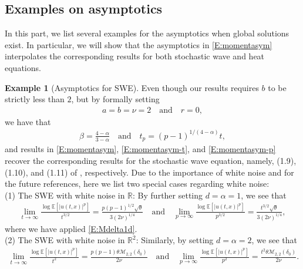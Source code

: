 \documentclass[12pt]{report}
\theoremstyle{plain}
\theoremstyle{definition}
\newtheorem{example}[theorem]{Example}
\numberwithin{equation}{section}
\newcommand{\R}{\mathbb{R}}
\newcommand{\E}{\mathbb{E}}
\begin{document}
\subsection{Examples on asymptotics} \label{SS:EgAsym}

In this part, we list several examples for the asymptotics when global solutions exist. In
particular, we will show that the asymptotics in \eqref{E:momentasym} interpolates the corresponding
results for both stochastic wave and heat equations.

\begin{example}[Asymptotics for SWE] \label{Eg:AsymSWE}
	Even though our results requires $b$ to be strictly less than $2$, but by formally setting
	\begin{align*}
	a = b = \nu = 2 \quad \text{and} \quad r = 0,
	\end{align*}
	we have that
	\begin{align*}
	\beta = \frac{4-\alpha}{3-\alpha} \quad \text{and} \quad
	t_p   = (p-1)^{1/(4-\alpha)} t,
	\end{align*}
	and results in \eqref{E:momentasym}, \eqref{E:momentasym-t}, and \eqref{E:momentasym-p} recover
	the corresponding results for the stochastic wave equation, namely, (1.9), (1.10), and (1.11) of \cite{balan.chen.ea:22:exact}, respectively.  Due to the importance of white noise and for the future references,
	here we list two special cases regarding white noise:\\
	
	\noindent(1) The SWE with white noise in $\R$: By further setting $d=\alpha=1$, we see that
	\begin{align} \label{E:AsymSWE-1d}
	\lim_{t \to \infty} \frac{\log \E\left[|u(t,x)|^p\right]}{t^{3/2}} =  \frac{p(p-1)^{1/2}\sqrt{\theta}}{3 (2\nu)^{1/4}}
	\quad \text{and} \quad
	\lim_{p \to \infty} \frac{\log \E\left[|u(t,x)|^p\right]}{p^{3/2}} = \frac{t^{3/2}\sqrt{\theta}}{3 (2\nu)^{1/4}},
	\end{align}
	where we have applied \eqref{E:Mdelta1d}.\\
	
	\noindent(2) The SWE with white noise in $\R^2$: Similarly, by setting $d=\alpha=2$, we see that
	\begin{align} \label{E:AsymSWE-2d}
	\lim_{t \to \infty} \frac{\log \E\left[|u(t,x)|^p\right]}{t^2} = \frac{p(p-1)\theta\mathcal{M}_{2,2}(\delta_0)}{2\nu}
	\quad \text{and} \quad
	\lim_{p \to \infty} \frac{\log \E\left[|u(t,x)|^p\right]}{p^2} = \frac{t^2\theta\mathcal{M}_{2,2}(\delta_0)}{2\nu}.
	\end{align}
\end{example}
\end{document}

